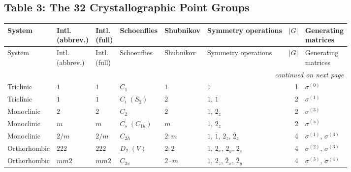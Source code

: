 \documentclass[a4paper,11pt]{article}
\newcommand{\ob}[1]{\overline{#1}}
\newcommand{\sg}[1]{\sigma^{(#1)}}
\begin{document}
%
%

\newpage
\begin{landscape}
\section*{Table 3: The 32 Crystallographic Point Groups}
\label{sec:table3}
\footnotesize
\begin{longtable}{l l l l l p{9.5cm} r l}
\toprule
System & \shortstack{Intl.\\(abbrev.)} & \shortstack{Intl.\\(full)} & Schoenflies & Shubnikov & Symmetry operations & $|G|$ & \shortstack{Generating\\matrices} \\
\midrule
\endfirsthead
\toprule
System & \shortstack{Intl.\\(abbrev.)} & \shortstack{Intl.\\(full)} & Schoenflies & Shubnikov & Symmetry operations & $|G|$ & \shortstack{Generating\\matrices} \\
\midrule
\endhead
\midrule
\multicolumn{8}{r}{\footnotesize\itshape continued on next page}\\
\endfoot
\bottomrule
\endlastfoot
Triclinic & $1$ & $1$ & $C_1$ & $1$ & $1$ & 1 & $\sg{0}$ \\
Triclinic & $\ob{1}$ & $\ob{1}$ & $C_i\;(S_2)$ & $\ob{2}$ & $1$, $\ob{1}$ & 2 & $\sg{1}$ \\
\addlinespace
Monoclinic & $2$ & $2$ & $C_2$ & $2$ & $1$, $2_z$ & 2 & $\sg{3}$ \\
Monoclinic & $m$ & $m$ & $C_s\;(C_{1h})$ & $m$ & $1$, $\ob{2}_z$ & 2 & $\sg{5}$ \\
Monoclinic & $2/m$ & $2/m$ & $C_{2h}$ & $2{:}m$ & $1$, $\ob{1}$, $2_z$, $\ob{2}_z$ & 4 & $\sg{1}$, $\sg{3}$ \\
\addlinespace
Orthorhombic & $222$ & $222$ & $D_2\;(V)$ & $2{:}2$ & $1$, $2_x$, $2_y$, $2_z$ & 4 & $\sg{2}$, $\sg{3}$ \\
Orthorhombic & $mm2$ & $mm2$ & $C_{2v}$ & $2{\cdot}m$ & $1$, $2_z$, $\ob{2}_x$, $\ob{2}_y$ & 4 & $\sg{3}$, $\sg{4}$ \\

\end{longtable}
\end{landscape}
\end{document}
